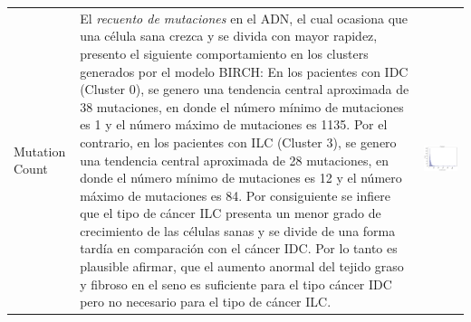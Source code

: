 \begin{table}
	\footnotesize
	\begin{threeparttable}
		\begin{tabular}{p{2.5cm} p{7cm} p{6.5cm}} \toprule
			Mutation Count
			&  El \textit{recuento de mutaciones} en el ADN, el cual ocasiona que una célula sana crezca y se divida con mayor rapidez, presento el siguiente comportamiento en los clusters generados por el modelo BIRCH:  En los pacientes con IDC (Cluster 0), se genero una tendencia central aproximada de 38 mutaciones, en donde el número mínimo de mutaciones es 1 y el número máximo de mutaciones es 1135. Por el contrario, en los pacientes con ILC (Cluster 3), se genero una tendencia central aproximada de 28 mutaciones, en donde el número mínimo de mutaciones es 12 y el número máximo de mutaciones es 84. Por consiguiente se infiere que el tipo de cáncer ILC presenta un menor grado de crecimiento de las células sanas y se divide de una forma tardía en comparación con el cáncer IDC. Por lo tanto es plausible afirmar, que el aumento anormal del tejido graso y fibroso en el seno es suficiente para el tipo cáncer IDC pero no necesario para el tipo de cáncer ILC. 
			& 
			\begin{center}\includegraphics[width=1\linewidth]{NOTEBOOK/IMAGENES_BIRCH_CLUSTERING/8_Cluster_0_mutation_count}\end{center}

\end{tabular}
\end{threeparttable}
\end{table}
